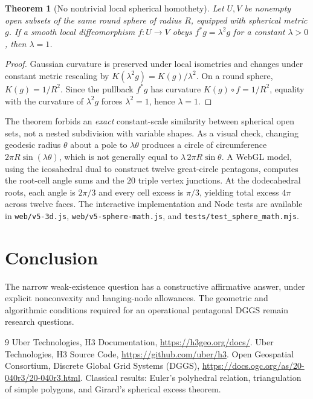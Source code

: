 \documentclass[11pt,a4paper]{article}
\newtheorem{theorem}{Theorem}
\begin{document}
\begin{theorem}[No nontrivial local spherical homothety]
Let $U,V$ be nonempty open subsets of the same round sphere of radius
$R$, equipped with spherical metric $g$. If a smooth local
diffeomorphism $f:U\to V$ obeys $f^*g=\lambda^2g$ for a constant
$\lambda>0$, then $\lambda=1$.
\end{theorem}
\begin{proof}
Gaussian curvature is preserved under local isometries and changes
under constant metric rescaling by $K(\lambda^2g)=K(g)/\lambda^2$.
On a round sphere, $K(g)=1/R^2$. Since the pullback $f^*g$
has curvature $K(g)\circ f=1/R^2$, equality with the curvature of
$\lambda^2g$ forces $\lambda^2=1$, hence $\lambda=1$.
\end{proof}

The theorem forbids an \emph{exact} constant-scale similarity
between spherical open sets, not a nested subdivision with variable
shapes. As a visual check, changing geodesic radius $\theta$ about
a pole to $\lambda\theta$ produces a circle of circumference
$2\pi R\sin(\lambda\theta)$, which is not generally equal to
$\lambda\,2\pi R\sin\theta$. A WebGL model, using the icosahedral
dual to construct twelve great-circle pentagons, computes the
root-cell angle sums and the $20$ triple vertex junctions. At the
dodecahedral roots, each angle is $2\pi/3$ and every cell excess is
$\pi/3$, yielding total excess $4\pi$ across twelve faces. The
interactive implementation and Node tests are available in
\texttt{web/v5-3d.js}, \texttt{web/v5-sphere-math.js}, and
\texttt{tests/test\_sphere\_math.mjs}.

\section{Conclusion}
The narrow weak-existence question has a constructive affirmative
answer, under explicit nonconvexity and hanging-node allowances.
The geometric and algorithmic conditions required for an
operational pentagonal DGGS remain research questions.
\begin{thebibliography}{9}
 Uber Technologies, H3 Documentation,
\url{https://h3geo.org/docs/}.
 Uber Technologies, H3 Source Code,
\url{https://github.com/uber/h3}.
 Open Geospatial Consortium, Discrete Global Grid
Systems (DGGS), \url{https://docs.ogc.org/as/20-040r3/20-040r3.html}.
 Classical results: Euler's polyhedral relation,
triangulation of simple polygons, and Girard's spherical excess theorem.
\end{thebibliography}
\end{document}
